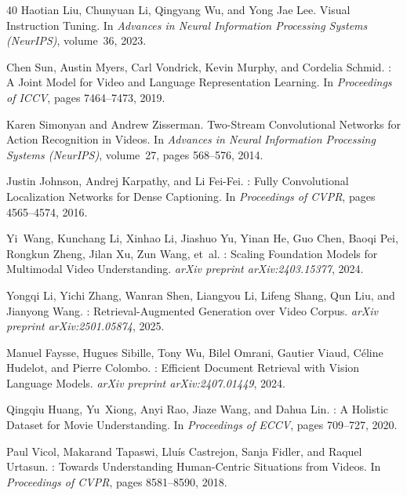 \documentclass[11pt]{article}
\begin{document}
\begin{thebibliography}{40}
Haotian Liu, Chunyuan Li, Qingyang Wu, and Yong Jae Lee.
\newblock Visual Instruction Tuning.
\newblock In \emph{Advances in Neural Information Processing Systems
(NeurIPS)}, volume~36, 2023.


Chen Sun, Austin Myers, Carl Vondrick, Kevin Murphy, and Cordelia Schmid.
: A Joint Model for Video and Language Representation
Learning.
\newblock In \emph{Proceedings of ICCV}, pages 7464--7473, 2019.

Karen Simonyan and Andrew Zisserman.
\newblock Two-Stream Convolutional Networks for Action Recognition in Videos.
\newblock In \emph{Advances in Neural Information Processing Systems
(NeurIPS)}, volume~27, pages 568--576, 2014.

Justin Johnson, Andrej Karpathy, and Li Fei-Fei.
: Fully Convolutional Localization Networks for Dense
Captioning.
\newblock In \emph{Proceedings of CVPR}, pages 4565--4574, 2016.

Yi~Wang, Kunchang Li, Xinhao Li, Jiashuo Yu, Yinan He, Guo Chen, Baoqi Pei,
Rongkun Zheng, Jilan Xu, Zun Wang, et~al.
: Scaling Foundation Models for Multimodal Video
Understanding.
\newblock \emph{arXiv preprint arXiv:2403.15377}, 2024.

Yongqi Li, Yichi Zhang, Wanran Shen, Liangyou Li, Lifeng Shang, Qun Liu,
and Jianyong Wang.
: Retrieval-Augmented Generation over Video Corpus.
\newblock \emph{arXiv preprint arXiv:2501.05874}, 2025.

Manuel Faysse, Hugues Sibille, Tony Wu, Bilel Omrani, Gautier Viaud,
C\'{e}line Hudelot, and Pierre Colombo.
: Efficient Document Retrieval with Vision Language Models.
\newblock \emph{arXiv preprint arXiv:2407.01449}, 2024.


Qingqiu Huang, Yu~Xiong, Anyi Rao, Jiaze Wang, and Dahua Lin.
: A Holistic Dataset for Movie Understanding.
\newblock In \emph{Proceedings of ECCV}, pages 709--727, 2020.

Paul Vicol, Makarand Tapaswi, Llu\'{i}s Castrejon, Sanja Fidler, and
Raquel Urtasun.
: Towards Understanding Human-Centric Situations from
Videos.
\newblock In \emph{Proceedings of CVPR}, pages 8581--8590, 2018.


\end{thebibliography}
\end{document}
